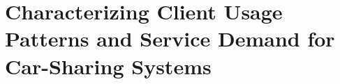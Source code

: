 
\chapter{Characterizing Client Usage Patterns and Service Demand for Car-Sharing Systems}
\label{chap:4_cs_comparison}
	\graphicspath{{Chapter4/}}















